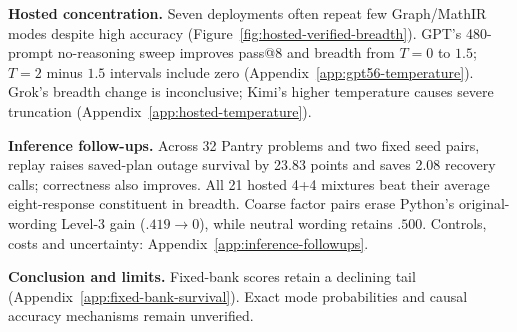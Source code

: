 \noindent\textbf{Hosted concentration.}
\label{sec:hosted-concentration}
Seven deployments often repeat few Graph/MathIR modes despite high accuracy
(Figure~\ref{fig:hosted-verified-breadth}). GPT's 480-prompt no-reasoning sweep
improves pass@8 and breadth from $T=0$ to $1.5$; $T=2$ minus $1.5$ intervals
include zero (Appendix~\ref{app:gpt56-temperature}). Grok's breadth change is inconclusive; Kimi's higher temperature causes
severe truncation (Appendix~\ref{app:hosted-temperature}).

\noindent\textbf{Inference follow-ups.}
Across 32 Pantry problems and two fixed seed pairs, replay raises saved-plan
outage survival by 23.83 points and saves 2.08 recovery calls; correctness also
improves. All 21 hosted 4+4 mixtures beat their average eight-response
constituent in breadth. Coarse factor pairs erase Python's original-wording
Level-3 gain ($.419\to0$), while neutral wording retains $.500$.
Controls, costs and uncertainty: Appendix~\ref{app:inference-followups}.

\noindent\textbf{Conclusion and limits.}
\label{sec:conclusion}\label{sec:discussion}\label{sec:limitations}
Fixed-bank scores retain a declining tail (Appendix~\ref{app:fixed-bank-survival}).
Exact mode probabilities and causal accuracy mechanisms remain unverified.

\label{main:lastpage}

\clearpage


\clearpage
\appendix



